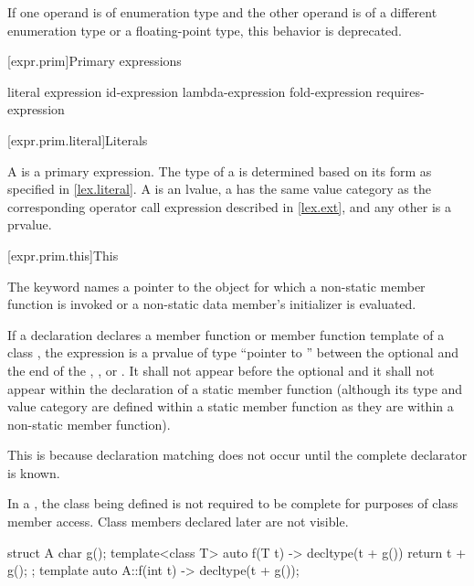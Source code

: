 \pnum
If one operand is of enumeration type
and the other operand is of
a different enumeration type or
a floating-point type,
this behavior is deprecated.

[expr.prim]{Primary expressions}%

\begin{bnf}
\br
    literal\br
    \br
    \terminal{(} expression \terminal{)}\br
    id-expression\br
    lambda-expression\br
    fold-expression\br
    requires-expression
\end{bnf}

[expr.prim.literal]{Literals}

\pnum
{}%
%
A  is a primary expression.
The type of a 
is determined based on its form as specified in \ref{lex.literal}.
A  is an lvalue,
a 
has the same value category
as the corresponding operator call expression described in \ref{lex.ext},
and any other  is a prvalue.

[expr.prim.this]{This}

\pnum
{}%
The keyword  names a pointer to the object for which a non-static member
function is invoked or a non-static data member's
initializer is evaluated.

\pnum
If a declaration declares a member function or member function template of a
class , the expression  is a prvalue of type ``pointer to
 '' between the optional
 and the end of the ,
, or . It shall not appear
before the optional  and it shall not appear within
the declaration of a static member function (although its type and value category
are defined within a static member function as they are within a non-static
member function).
\begin{note}
This is because declaration matching does not
occur until the complete declarator is known.
\end{note}
\begin{note}
In a ,
the class being defined is not required to be complete
for purposes of class member access.
Class members declared later are not visible.
\begin{example}
\begin{codeblock}
struct A {
  char g();
  template<class T> auto f(T t) -> decltype(t + g())
    { return t + g(); }
};
template auto A::f(int t) -> decltype(t + g());
\end{codeblock}
\end{example}
\end{note}


